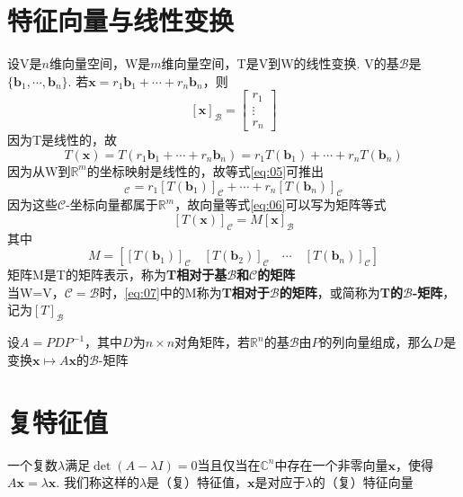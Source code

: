 \section{特征向量与线性变换}
设V是$n$维向量空间，W是$m$维向量空间，T是V到W的线性变换. V的基$\mathcal{B}$是$\{\bm{b}_1,\cdots,\bm{b}_n\}$. 若$\bm{x}=r_1\bm{b}_1+\cdots+r_n\bm{b}_n$，则
\[[\bm{x}]_{\mathcal{B}}=\left[\begin{array}{c}
r_1\\
\vdots\\
r_n
\end{array}\right]\]
因为T是线性的，故
\begin{equation}
T(\bm{x})=T(r_1\bm{b}_1+\cdots+r_n\bm{b}_n)=r_1T(\bm{b}_1)+\cdots+r_nT(\bm{b}_n)\label{eq:05}
\end{equation}
因为从W到$\mathbb{R}^m$的坐标映射是线性的，故等式\eqref{eq:05}可推出
\begin{equation}
[T(\bm{x})]_{\mathcal{C}}=r_1[T(\bm{b}_1)]_{\mathcal{C}}+\cdots+r_n[T(\bm{b}_n)]_{\mathcal{C}}\label{eq:06}
\end{equation}
因为这些$\mathcal{C}$-坐标向量都属于$\mathbb{R}^m$，故向量等式\eqref{eq:06}可以写为矩阵等式
\[[T(\bm{x})]_{\mathcal{C}}=M[\bm{x}]_{\mathcal{B}}\]
其中
\begin{equation}
M=[[T(\bm{b}_1)]_{\mathcal{C}}\quad[T(\bm{b}_2)]_{\mathcal{C}}\quad\cdots\quad[T(\bm{b}_n)]_{\mathcal{C}}]\label{eq:07}
\end{equation}
矩阵M是T的矩阵表示，称为\textbf{T相对于基$\mathcal{B}$和$\mathcal{C}$的矩阵}\\[2ex]

当W=V，$\mathcal{C=B}$时，\eqref{eq:07}中的M称为\textbf{T相对于$\mathcal{B}$的矩阵}，或简称为\textbf{T的$\mathcal{B}$-矩阵}，记为$[T]_{\mathcal{B}}$\\[2ex]

\begin{TheoremTwo}[（对角矩阵表示）]
设$A=PDP^{-1}$，其中$D$为$n\times n$对角矩阵，若$\mathbb{R}^n$的基$\mathcal{B}$由$P$的列向量组成，那么$D$是变换$\bm{x}\mapsto A\bm{x}$的$\mathcal{B}$-矩阵
\end{TheoremTwo}\vspace{4ex}

\section{复特征值}
一个复数$\lambda$满足$\det(A-\lambda I)=0$当且仅当在$\mathbb{C}^n$中存在一个非零向量$\bm{x}$，使得$A\bm{x}=\lambda\bm{x}$. 我们称这样的$\lambda$是（复）特征值，$\bm{x}$是对应于$\lambda$的（复）特征向量\\[2ex]

